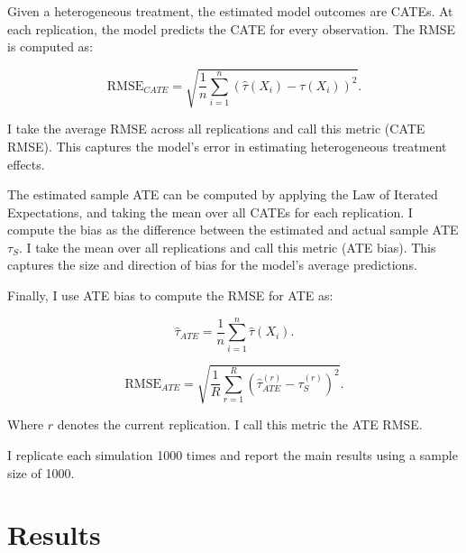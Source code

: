 \documentclass[12pt, oneside]{article}   	%
\begin{document}
Given a heterogeneous treatment, the estimated model outcomes are CATEs. At each replication, the model predicts the CATE for every observation. The RMSE is computed as:

$$
\mathrm{RMSE}_{CATE}
=
\sqrt{
\frac{1}{n}\sum_{i=1}^{n}
\left(\hat{\tau}(X_i)-\tau(X_i)\right)^2
}.
$$

I take the average RMSE across all replications and call this metric (CATE RMSE). This captures the model’s error in estimating heterogeneous treatment effects.

The estimated sample ATE can be computed by applying the Law of Iterated Expectations, and taking the mean over all CATEs for each replication. I compute the bias as the difference between the estimated and actual sample ATE $\tau_{S}$. I take the mean over all replications and call this metric (ATE bias). This captures the size and direction of bias for the model’s average predictions.

Finally, I use ATE bias to compute the RMSE for ATE as:

$$
\hat{\tau}_{ATE}
=
\frac{1}{n}\sum_{i=1}^{n}\hat{\tau}(X_i).
$$

$$
\mathrm{RMSE}_{ATE}
=
\sqrt{
\frac{1}{R}\sum_{r=1}^{R}
\left(\hat{\tau}_{ATE}^{(r)}-\tau_S^{(r)}\right)^2
}.
$$

Where $r$ denotes the current replication. I call this metric the ATE RMSE.

I replicate each simulation 1000 times and report the main results using a sample size of 1000.

\section{Results}
\end{document}
